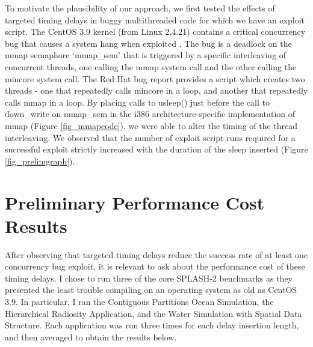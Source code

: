 \documentclass[letterpaper,twocolumn,10pt]{article}
\begin{document}
To motivate the plausibility of our approach, we first tested the effects of targeted timing delays in buggy multithreaded code for which we have an exploit script.  The CentOS 3.9 kernel (from Linux 2.4.21) contains a critical concurrency bug that causes a system hang when exploited \cite{CVE2006-4814}.  The bug is a deadlock on the mmap semaphore `mmap\_sem' that is triggered by a specific interleaving of concurrent threads, one calling the mmap system call and the other calling the mincore system call.  The Red Hat bug report \cite{RHELbug180663} provides a script which creates two threads - one that repeatedly calls mincore in a loop, and another that repeatedly calls mmap in a loop.  By placing calls to usleep() just before the call to down\_write on mmap\_sem in the i386 architecture-specific implementation of mmap (Figure \ref{fig_mmapcode}), we were able to alter the timing of the thread interleaving.  We observed that the number of exploit script runs required for a successful exploit strictly increased with the duration of the sleep inserted (Figure \ref{fig_prelimgraph}).

\section{Preliminary Performance Cost Results}
After observing that targeted timing delays reduce the success rate of at least one concurrency bug exploit, it is relevant to ask about the performance cost of these timing delays.  I chose to run three of the core SPLASH-2 benchmarks \cite{Woo1995} as they presented the least trouble compiling on an operating system as old as CentOS 3.9.  In particular, I ran the Contiguous Partitions Ocean Simulation, the Hierarchical Radiosity Application, and the Water Simulation with Spatial Data Structure.  Each application was run three times for each delay insertion length, and then averaged to obtain the results below.
\end{document}
